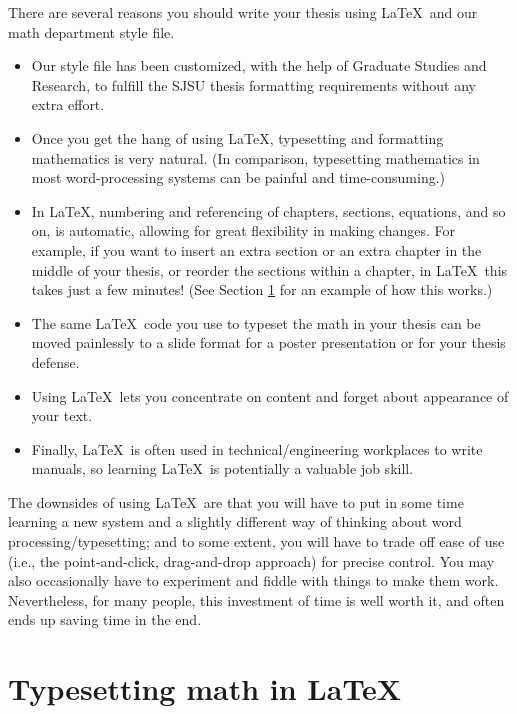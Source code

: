 \documentclass[modernstyle,12pt]{sjsuthesis}
\theoremstyle{definition}
\begin{document}
There are several reasons you should write your thesis using \LaTeX\
and our math department style file.

\begin{itemize}
\item Our style file has been customized, with the help of Graduate
  Studies and Research, to fulfill the SJSU thesis formatting
  requirements without any extra effort.
\item Once you get the hang of using \LaTeX, typesetting and
  formatting mathematics is very natural.  (In comparison, typesetting
  mathematics in most word-processing systems can be painful and
  time-consuming.)
\item In \LaTeX, numbering and referencing of chapters, sections,
  equations, and so on, is automatic, allowing for great flexibility
  in making changes.  For example, if you want to insert an extra
  section or an extra chapter in the middle of your thesis, or reorder
  the sections within a chapter, in \LaTeX\ this takes just a few
  minutes!  (See Section \ref{sect:latex-math} for an example of how
  this works.)
\item The same \LaTeX\ code you use to typeset the math in your thesis
  can be moved painlessly to a slide format for a poster presentation
  or for your thesis defense.
\item Using \LaTeX\ lets you concentrate on content and forget about
  appearance of your text.
\item Finally, \LaTeX\ is often used in technical/engineering
  workplaces to write manuals, so learning \LaTeX\ is potentially a
  valuable job skill.
\end{itemize}

The downsides of using \LaTeX\ are that you will have to put in some
time learning a new system and a slightly different way of thinking
about word processing/typesetting; and to some extent, you will have
to trade off ease of use (i.e., the point-and-click, drag-and-drop
approach) for precise control.  You may also occasionally have to
experiment and fiddle with things to make them work.  Nevertheless,
for many people, this investment of time is well worth it, and often
ends up saving time in the end.



\section{Typesetting math in \LaTeX}
\label{sect:latex-math}
\end{document}
